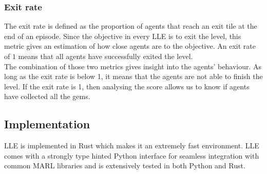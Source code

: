 \subsubsection{Exit rate}
The exit rate is defined as the proportion of agents that reach an exit tile at the end of an episode. Since the objective in every LLE is to exit the level, this metric gives an estimation of how close agents are to the objective. An exit rate of $1$ means that all agents have successfully exited the level.\\

The combination of those two metrics gives insight into the agents' behaviour. As long as the exit rate is below 1, it means that the agents are not able to finish the level. If the exit rate is 1, then analysing the score allows us to know if agents have collected all the gems.



\subsection{Implementation}
LLE is implemented in Rust which makes it an extremely fast environment. LLE comes with a strongly type hinted Python interface for seamless integration with common MARL libraries and is extensively tested in both Python and Rust.
